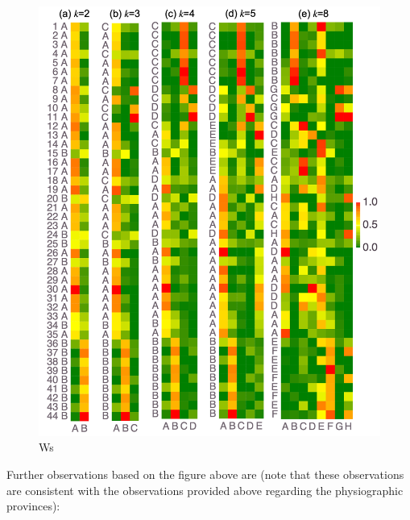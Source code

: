\documentclass[11pt]{article}
\begin{document}
\begin{figure}
\centering
\includegraphics{../figures-case01/locations.png}
\caption{Ws}
\end{figure}

Further observations based on the figure above are (note that these
observations are consistent with the observations provided above
regarding the physiographic provinces):
\end{document}

